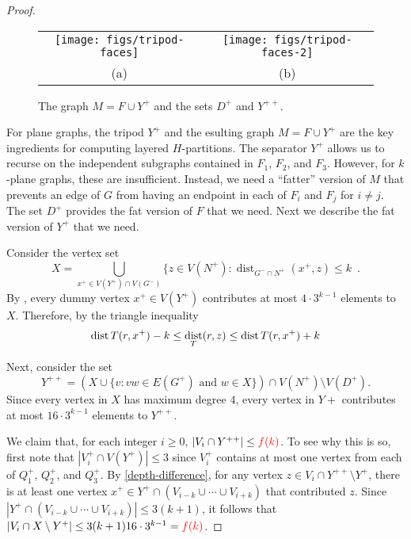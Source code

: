 \documentclass{patmorin}
\DeclareMathOperator{\dist}{dist}
\newcommand{\fk}{{\color{red}f(k)}}
\begin{document}
\begin{proof}
  \begin{figure}
    \begin{center}
      \begin{tabular}{cc}
        \texttt{[image: figs/tripod-faces]} &
        \texttt{[image: figs/tripod-faces-2]} \\
        (a) & (b)
      \end{tabular}
    \end{center}
    \caption{The graph $M=F\cup Y^+$ and the sets $D^+$ and $Y^{++}$.}
  \end{figure}
  
  For plane graphs, the tripod $Y^+$ and the esulting graph $M=F\cup Y^+$ are the key ingredients for computing layered $H$-partitions.  The separator $Y^+$ allows us to recurse on the independent subgraphs contained in $F_1$, $F_2$, and $F_3$.  However, for $k$-plane graphs, these are insufficient.  Instead, we need a ``fatter'' version of $M$ that prevents an edge of $G$ from having an endpoint in each of $F_i$ and $F_j$ for $i\neq j$.  The set $D^+$ provides the fat version of $F$ that we need.  Next we describe the fat version of $Y^+$ that we need.  

  Consider the vertex set 
  \[  
       X=\bigcup_{x^+\in V(Y^+)\cap V(G^-)}\{z\in V(N^+): \dist_{G^-\cap N^+}(x^+,z)\le k \enspace .
  \]
  By , every dummy vertex $x^+\in V(Y^+)$ contributes at most $4\cdot3^{k-1}$ elements to $X$.
  Therefore, by the triangle inequality
  \begin{equation}
      \dist{T}(r,x^+) - k \le \dist_{T}(r,z) \le \dist{T}(r,x^+) + k
      \eqlabel{depth-difference}
  \end{equation}

  Next, consider the set 
  \[  
    Y^{++}=(X\cup\{ v: \mbox{$vw\in E(G^+)$ and $w\in X$}\})\cap V(N^+) \setminus V(D^+).  
  \]
  Since every vertex in $X$ has maximum degree $4$, every vertex in $Y+$ contributes at most $16\cdot 3^{k-1}$ elements to $Y^{++}$.
  
  We claim that, for each integer $i\ge 0$, $|V_i\cap Y^{++}|\le \fk$.  To see why this is so, first note that $|V_i^+\cap V(Y^+)|\le 3$ since $V_i^+$ contains at most one vertex from each of $Q_1^+$, $Q_2^+$, and $Q_3^+$.  By \eqref{depth-difference}, for any vertex $z\in V_i\cap Y^{++}\setminus Y^+$, there is at least one vertex $x^+\in Y^+\cap (V_{i-k}\cup \cdots\cup V_{i+k})$ that contributed $z$.  Since $|Y^+\cap (V_{i-k}\cup \cdots\cup V_{i+k})|\le 3(k+1)$, it follows that $|V_i\cap X\setminus Y^+|\le 3(k+1)16\cdot 3^{k-1}= \fk$.
  

\end{proof}
\end{document}
